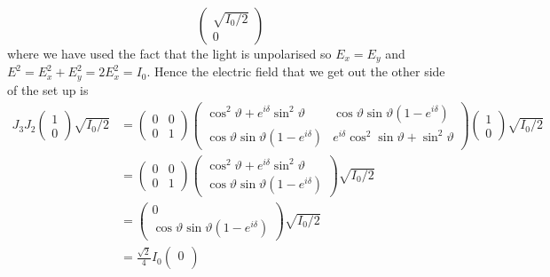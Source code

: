 \begin{example}
\[\begin{pmatrix}
                \sqrt{I_0/2}\\ 0
            \end{pmatrix}
        \]
        where we have used the fact that the light is unpolarised so \(E_x = E_y\) and \(E^2 = E_x^2 + E_y^2 = 2E_x^2 = I_0\).
        Hence the electric field that we get out the other side of the set up is
        \begin{align*}
            J_3J_2
            \begin{pmatrix}
                1\\ 0
            \end{pmatrix}
            \sqrt{I_0/2} &= 
            \begin{pmatrix}
                0 & 0\\
                0 & 1
            \end{pmatrix}
            \begin{pmatrix}
                \cos^2\vartheta + e^{i\delta}\sin^2\vartheta & \cos\vartheta\sin\vartheta(1 - e^{i\delta})\\
                \cos\vartheta\sin\vartheta(1 - e^{i\delta}) & e^{i\delta}\cos^2\sin\vartheta + \sin^2\vartheta
            \end{pmatrix}
            \begin{pmatrix}
                1\\ 0
            \end{pmatrix}
            \sqrt{I_{0}/2}\\
            &= 
            \begin{pmatrix}
                0 & 0\\
                0 & 1
            \end{pmatrix}
            \begin{pmatrix}
                \cos^2\vartheta + e^{i\delta}\sin^2\vartheta\\
                \cos\vartheta\sin\vartheta(1 - e^{i\delta})
            \end{pmatrix}
            \sqrt{I_0/2}\\
            &=
            \begin{pmatrix}
                0\\
                \cos\vartheta\sin\vartheta(1 - e^{i\delta})
            \end{pmatrix}
            \sqrt{I_0/2}\\
            &= \frac{\sqrt{2}}{4}I_0
            \begin{pmatrix}
                0\\

\end{pmatrix}
\end{align*}
\end{example}
